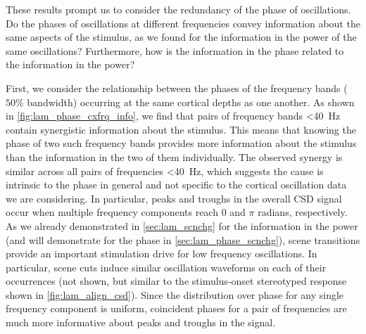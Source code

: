 These results prompt us to consider the redundancy of the phase of oscillations.
Do the phases of oscillations at different frequencies convey information about the same aspects of the stimulus, as we found for the information in the power of the same oscillations?
Furthermore, how is the information in the phase related to the information in the power?

First, we consider the relationship between the phases of the frequency bands ($50\%$ bandwidth) occurring at the same cortical depths as one another.
As shown in \autoref{fig:lam_phase_cxfrq_info}, we find that pairs of frequency bands \SI{<40}{Hz} contain synergistic information about the stimulus.
This means that knowing the phase of two such frequency bands provides more information about the stimulus than the information in the two of them individually.
The observed synergy is similar across all pairs of frequencies \SI{<40}{Hz}, which suggests the cause is intrinsic to the phase in general and not specific to the cortical oscillation data we are considering.
In particular, peaks and troughs in the overall \ac{CSD} signal occur when multiple frequency components reach $0$ and $\pi$ radians, respectively.
As we already demonstrated in \autoref{sec:lam_scnchg} for the information in the power (and will demonstrate for the phase in \autoref{sec:lam_phase_scnchg}), scene transitions provide an important stimulation drive for low frequency oscillations.
In particular, scene cuts induce similar oscillation waveforms on each of their occurrences (not shown, but similar to the stimulus-onset stereotyped response shown in \autoref{fig:lam_align_csd}).
Since the distribution over phase for any single frequency component is uniform, coincident phases for a pair of frequencies are much more informative about peaks and troughs in the signal.
%
%
%


